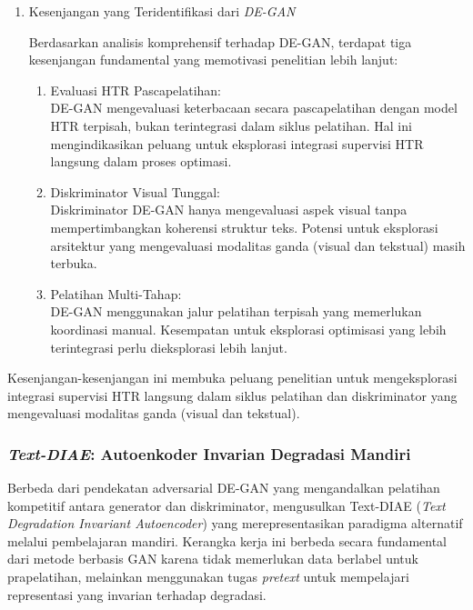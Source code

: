 \begin{enumerate}[leftmargin=*, labelindent=0pt, itemsep=1ex, topsep=0pt]
\item Kesenjangan yang Teridentifikasi dari \textit{DE-GAN}

Berdasarkan analisis komprehensif terhadap DE-GAN, terdapat tiga kesenjangan fundamental yang memotivasi penelitian lebih lanjut:

\begin{enumerate}[leftmargin=1.5em, labelsep=0.5em, itemindent=0pt, label=\alph*., topsep=0pt, parsep=0pt, itemsep=0pt]
      \item Evaluasi HTR Pascapelatihan: \mbox{}\\[0.1em]
            DE-GAN mengevaluasi keterbacaan secara pascapelatihan dengan model HTR terpisah, bukan terintegrasi dalam siklus pelatihan. Hal ini mengindikasikan peluang untuk eksplorasi integrasi supervisi HTR langsung dalam proses optimasi.

      \item Diskriminator Visual Tunggal: \mbox{}\\[0.1em]
            Diskriminator DE-GAN hanya mengevaluasi aspek visual tanpa mempertimbangkan koherensi struktur teks. Potensi untuk eksplorasi arsitektur yang mengevaluasi modalitas ganda (visual dan tekstual) masih terbuka.

      \item Pelatihan Multi-Tahap: \mbox{}\\[0.1em]
            DE-GAN menggunakan jalur pelatihan terpisah yang memerlukan koordinasi manual. Kesempatan untuk eksplorasi optimisasi yang lebih terintegrasi perlu dieksplorasi lebih lanjut.
\end{enumerate}

\end{enumerate}

Kesenjangan-kesenjangan ini membuka peluang penelitian untuk mengeksplorasi integrasi supervisi HTR langsung dalam siklus pelatihan dan diskriminator yang mengevaluasi modalitas ganda (visual dan tekstual).

\subsubsection{\textit{Text-DIAE}: Autoenkoder Invarian Degradasi Mandiri}
\label{subsubsec:text-diae}

Berbeda dari pendekatan adversarial DE-GAN yang mengandalkan pelatihan kompetitif antara generator dan diskriminator, \parencite{textdiae2022} mengusulkan Text-DIAE (\textit{Text Degradation Invariant Autoencoder}) yang merepresentasikan paradigma alternatif melalui pembelajaran mandiri. Kerangka kerja ini berbeda secara fundamental dari metode berbasis GAN karena tidak memerlukan data berlabel untuk prapelatihan, melainkan menggunakan tugas \textit{pretext} untuk mempelajari representasi yang invarian terhadap degradasi.


